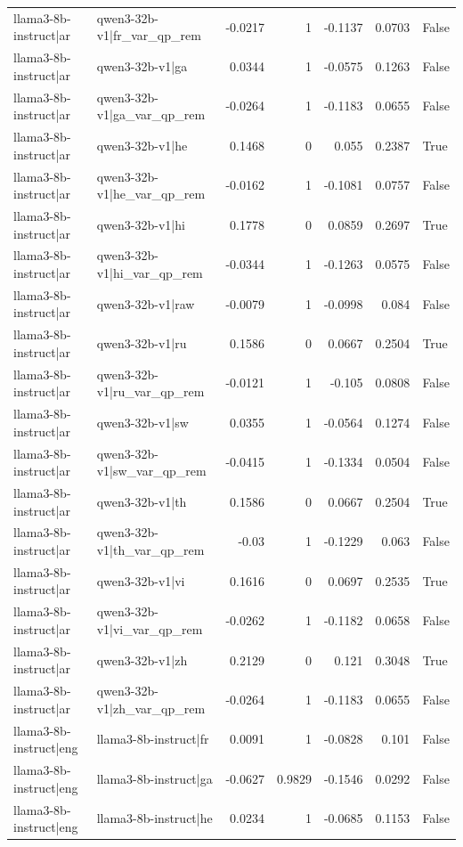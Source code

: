 \begin{table}
\begin{tabular}{l l r r r r l}
llama3-8b-instruct|ar & qwen3-32b-v1|fr_var_qp_rem & -0.0217 & 1 & -0.1137 & 0.0703 & False \\
llama3-8b-instruct|ar & qwen3-32b-v1|ga & 0.0344 & 1 & -0.0575 & 0.1263 & False \\
llama3-8b-instruct|ar & qwen3-32b-v1|ga_var_qp_rem & -0.0264 & 1 & -0.1183 & 0.0655 & False \\
llama3-8b-instruct|ar & qwen3-32b-v1|he & 0.1468 & 0 & 0.055 & 0.2387 & True \\
llama3-8b-instruct|ar & qwen3-32b-v1|he_var_qp_rem & -0.0162 & 1 & -0.1081 & 0.0757 & False \\
llama3-8b-instruct|ar & qwen3-32b-v1|hi & 0.1778 & 0 & 0.0859 & 0.2697 & True \\
llama3-8b-instruct|ar & qwen3-32b-v1|hi_var_qp_rem & -0.0344 & 1 & -0.1263 & 0.0575 & False \\
llama3-8b-instruct|ar & qwen3-32b-v1|raw & -0.0079 & 1 & -0.0998 & 0.084 & False \\
llama3-8b-instruct|ar & qwen3-32b-v1|ru & 0.1586 & 0 & 0.0667 & 0.2504 & True \\
llama3-8b-instruct|ar & qwen3-32b-v1|ru_var_qp_rem & -0.0121 & 1 & -0.105 & 0.0808 & False \\
llama3-8b-instruct|ar & qwen3-32b-v1|sw & 0.0355 & 1 & -0.0564 & 0.1274 & False \\
llama3-8b-instruct|ar & qwen3-32b-v1|sw_var_qp_rem & -0.0415 & 1 & -0.1334 & 0.0504 & False \\
llama3-8b-instruct|ar & qwen3-32b-v1|th & 0.1586 & 0 & 0.0667 & 0.2504 & True \\
llama3-8b-instruct|ar & qwen3-32b-v1|th_var_qp_rem & -0.03 & 1 & -0.1229 & 0.063 & False \\
llama3-8b-instruct|ar & qwen3-32b-v1|vi & 0.1616 & 0 & 0.0697 & 0.2535 & True \\
llama3-8b-instruct|ar & qwen3-32b-v1|vi_var_qp_rem & -0.0262 & 1 & -0.1182 & 0.0658 & False \\
llama3-8b-instruct|ar & qwen3-32b-v1|zh & 0.2129 & 0 & 0.121 & 0.3048 & True \\
llama3-8b-instruct|ar & qwen3-32b-v1|zh_var_qp_rem & -0.0264 & 1 & -0.1183 & 0.0655 & False \\
llama3-8b-instruct|eng & llama3-8b-instruct|fr & 0.0091 & 1 & -0.0828 & 0.101 & False \\
llama3-8b-instruct|eng & llama3-8b-instruct|ga & -0.0627 & 0.9829 & -0.1546 & 0.0292 & False \\
llama3-8b-instruct|eng & llama3-8b-instruct|he & 0.0234 & 1 & -0.0685 & 0.1153 & False \\

\end{tabular}
\end{table}
